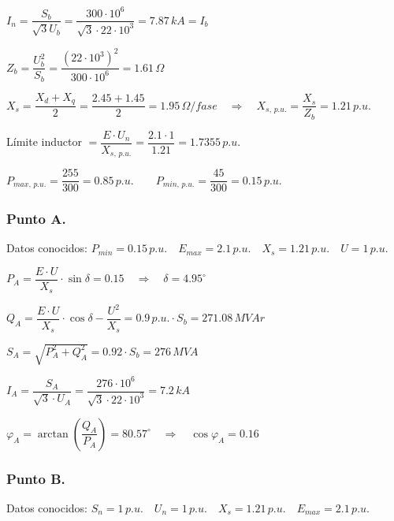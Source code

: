		\vspace{0.1cm}
		$I_n = \dfrac{S_b}{\sqrt{3}U_b} = \dfrac{300\cdot 10^6}{\sqrt{3}\cdot 22\cdot 10^3} = 7.87\,kA = I_b$
		
		\vspace{0.1cm}
		$Z_b = \dfrac{U_b^2}{S_b} = \dfrac{(22\cdot 10^3)^2}{300\cdot 10^6} = 1.61\,\varOmega$
		
		\vspace{0.1cm}
		$X_s = \dfrac{X_d + X_q}{2} = \dfrac{2.45 + 1.45}{2} = 1.95\,\varOmega/fase\quad \Rightarrow \quad X_{s,\,p.u.} = \dfrac{X_s}{Z_b} = 1.21\,p.u.$
		
		\vspace{0.1cm}
		Límite inductor $=\dfrac{E\cdot U_n}{X_{s,\,p.u.}} = \dfrac{2.1\cdot 1}{1.21} = 1.7355\,p.u.$
		
		\vspace{0.1cm}
		$P_{max,\,p.u.} = \dfrac{255}{300} = 0.85\,p.u.\qquad P_{min,\,p.u.} = \dfrac{45}{300} = 0.15\,p.u.$
		
		\subsubsection*{Punto A.}
			Datos conocidos: $P_{min} = 0.15\,p.u.\quad E_{max} = 2.1\,p.u.\quad X_s = 1.21\,p.u.\quad U = 1\,p.u.$
			
			\vspace{0.1cm}
			$P_A = \dfrac{E\cdot U}{X_s}\cdot \sin \delta = 0.15 \quad \Rightarrow \quad \delta = 4.95^\circ$
			
			\vspace{0.1cm}
			$Q_A = \dfrac{E\cdot U}{X_s}\cdot \cos \delta - \dfrac{U^2}{X_s} = 0.9\,p.u.\cdot S_b = 271.08\,MV\!Ar$
			
			\vspace{0.1cm}
			$S_A = \sqrt{P_A^2+Q_A^2} = 0.92\cdot S_b = 276\,MV\!A$
			
			\vspace{0.1cm}
			$I_A = \dfrac{S_A}{\sqrt{3}\cdot U_A} = \dfrac{276\cdot 10^6}{\sqrt{3}\cdot 22\cdot 10^3} = 7.2\,kA$
			
			\vspace{0.1cm}
			$\varphi_A = \arctan \left(\dfrac{Q_A}{P_A}\right) = 80.57^\circ \quad \Rightarrow \quad \cos \varphi_A = 0.16$
		
		\subsubsection*{Punto B.}
			Datos conocidos: $S_n = 1\,p.u.\quad U_n = 1\,p.u.\quad X_s = 1.21\,p.u.\quad E_{max} = 2.1\,p.u.$
			

